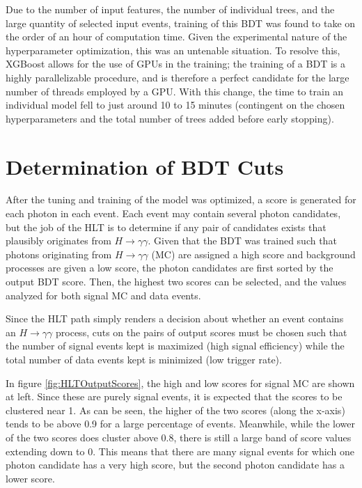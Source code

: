 \documentclass[12pt]{ucsddissertation}
\begin{document}
Due to the number of input features, the number of individual trees, and the large quantity of selected input events, training of this BDT was found to take on the order of an hour of computation time. Given the experimental nature of the hyperparameter optimization, this was an untenable situation. To resolve this, XGBoost allows for the use of GPUs in the training; the training of a BDT is a highly parallelizable procedure, and is therefore a perfect candidate for the large number of threads employed by a GPU. With this change, the time to train an individual model fell to just around 10 to 15 minutes (contingent on the chosen hyperparameters and the total number of trees added before early stopping). 

\section{Determination of BDT Cuts}\label{sec:cutChoices}
After the tuning and training of the model was optimized, a score is generated for each photon in each event. Each event may contain several photon candidates, but the job of the HLT is to determine if any pair of candidates exists that plausibly originates from $H \rightarrow \gamma\gamma$. Given that the BDT was trained such that photons originating from $H \rightarrow \gamma\gamma$ (MC) are assigned a high score and background processes are given a low score, the photon candidates are first sorted by the output BDT score. Then, the highest two scores can be selected, and the values analyzed for both signal MC and data events. 

Since the HLT path simply renders a decision about whether an event contains an $H \rightarrow \gamma\gamma$ process, cuts on the pairs of output scores must be chosen such that the number of signal events kept is maximized (high signal efficiency) while the total number of data events kept is minimized (low trigger rate). 

In figure \ref{fig:HLTOutputScores}, the high and low scores for signal MC are shown at left. Since these are purely signal events, it is expected that the scores to be clustered near 1. As can be seen, the higher of the two scores (along the x-axis) tends to be above 0.9 for a large percentage of events. Meanwhile, while the lower of the two scores does cluster above 0.8, there is still a large band of score values extending down to 0. This means that there are many signal events for which one photon candidate has a very high score, but the second photon candidate has a lower score. 
\end{document}
